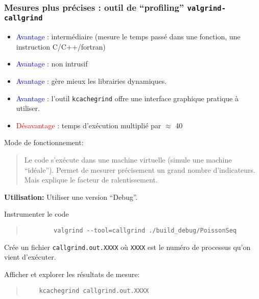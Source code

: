 \documentclass{beamer}
\begin{document}
\begin{frame}
\frametitle{Mesures plus pr\'ecises : outil de ``profiling'' {\tt valgrind-callgrind}}

\begin{itemize}
	\item \textcolor{blue}{Avantage} : interm\'ediaire (mesure le temps pass\'e dans une fonction, une instruction C/C++/fortran)
	\item \textcolor{blue}{Avantage} : non intrusif
	\item \textcolor{blue}{Avantage} : g\`ere mieux les librairies dynamiques.
	\item \textcolor{blue}{Avantage} : l'outil {\tt kcachegrind} offre une interface graphique pratique \`a utiliser.
	\item \textcolor{red}{D\'esavantage} : temps d'ex\'ecution multipli\'e par $\approx$ 40
\end{itemize}
\vfill
\end{frame}

\begin{frame}[fragile]
Mode de fonctionnement:
\begin{quote}
	Le code s'ex\'ecute dans une machine virtuelle (simule une machine ``id\'eale''). Permet de mesurer pr\'ecisement un grand nombre d'indicateurs. Mais explique le facteur de ralentissement.
\end{quote}

{\bf Utilisation:}
Utiliser une version ``Debug''.

\vfill
Instrumenter le code
	\begin{quote}
		\begin{verbatim}
		valgrind --tool=callgrind ./build_debug/PoissonSeq
		\end{verbatim}
	\end{quote}

Cr\'ee un fichier {\tt callgrind.out.XXXX} o\`u {\tt XXXX} est le num\'ero de processus qu'on vient d'ex\'ecuter.

\vfill
Afficher et explorer les r\'esultats de mesure:
\begin{quote}
	\begin{verbatim}
	kcachegrind callgrind.out.XXXX
	\end{verbatim}
\end{quote}
\vfill

\end{frame}
\end{document}
